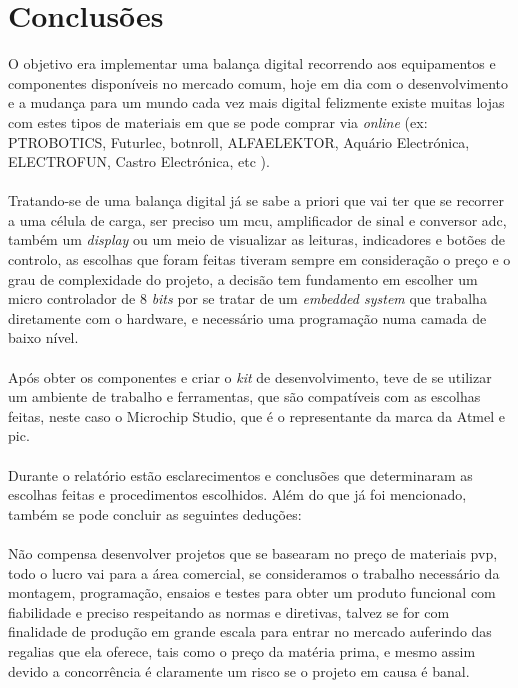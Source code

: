 \chapter{Conclusões}
O objetivo era implementar uma balança digital recorrendo aos equipamentos e componentes disponíveis no mercado comum, hoje em dia com o desenvolvimento e a mudança para um mundo cada vez mais digital felizmente existe muitas lojas com estes tipos de materiais em que se pode comprar via \textit{online} (ex: PTROBOTICS, Futurlec, botnroll, ALFAELEKTOR, Aquário Electrónica, ELECTROFUN, Castro Electrónica, etc ).
\\
\\
Tratando-se de uma balança digital já se sabe a priori que vai ter que se recorrer a uma célula de carga, ser preciso um \acs{mcu}, amplificador de sinal e conversor \acs{adc}, também um \textit{display} ou um meio de visualizar as leituras, indicadores e botões de controlo, as escolhas que foram feitas tiveram sempre em consideração o preço e o grau de complexidade do projeto, a decisão tem fundamento em escolher um micro controlador de 8 \textit{bits} por se tratar de um \textit{embedded system} que trabalha diretamente com o hardware, e necessário uma programação numa camada de baixo nível.
\\
\\
Após obter os componentes e criar o \textit{kit} de desenvolvimento, teve de se utilizar um ambiente de trabalho e ferramentas, que são compatíveis com as escolhas feitas, neste caso o Microchip Studio, que é o representante da marca da Atmel e \acs{pic}.
\\
\\
Durante o relatório estão esclarecimentos e conclusões que determinaram as escolhas feitas e procedimentos escolhidos. Além do que já foi mencionado, também se pode concluir as seguintes deduções:
\\
\\
Não compensa desenvolver projetos que se basearam no preço de materiais \ac{pvp}, todo o lucro vai para a área comercial, se consideramos o trabalho necessário da montagem, programação, ensaios e testes para obter um produto funcional com fiabilidade e preciso respeitando as normas e diretivas, talvez se for com finalidade de produção em grande escala para entrar no mercado auferindo das regalias que ela oferece, tais como o preço da matéria prima, e mesmo assim devido a concorrência é claramente um risco se o projeto em causa é banal.
